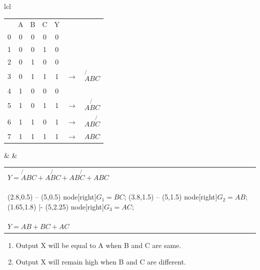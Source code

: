 \begin{tabular}{lcl}
   \begin{adjustbox}{valign=t}
      \begin{tabularx}{7cm}{l|C|C|C|C|cl}
         & A & B & C & Y \\
         0 & 0 & 0 & 0 & 0 \\
         1 & 0 & 0 & 1 & 0 \\
         2 & 0 & 1 & 0 & 0 \\
         3 & 0 & 1 & 1 & 1 & $\to$ & $\not{A}BC$\\
         4 & 1 & 0 & 0 & 0 \\
         5 & 1 & 0 & 1 & 1 & $\to$ & $A\not{B}C$ \\
         6 & 1 & 1 & 0 & 1 & $\to$ & $AB\not{C}$ \\
         7 & 1 & 1 & 1 & 1 & $\to$ & $ABC$ \\
      \end{tabularx}
   \end{adjustbox}
   & \hspace{2cm} &
   \begin{adjustbox}{valign=t}
      \begin{tabular}{l}
         $Y=\not{A}BC+A\not{B}C+AB\not{C}+ABC$\\[2em]
         \begin{Karnaugh}[3]
            \minterms{3,5,6,7}
            \implicant{3}{7}
            \implicant{5}{7}
            \implicant{7}{6}
      
            \draw[-latex](2.8,0.5) -- (5,0.5)
            node[right]{$G_1 = BC$};
            \draw[-latex](3.8,1.5) -- (5,1.5)
            node[right]{$G_2 = AB$};
            \draw[-latex](1.65,1.8) |- (5,2.25)
            node[right]{$G_3 = AC$};
         \end{Karnaugh}\\
         \quad \quad \quad \quad
         $Y = AB + BC + AC$
      \end{tabular}
   \end{adjustbox}
\end{tabular}


\vspace{1.5em}
\begin{enumerate}[itemsep=0.25em, label=(\roman*)]
   \item Output X will be equal to A when B and C are same.
   \item Output X will remain high when B and C are different.
\end{enumerate}

